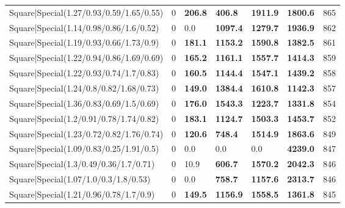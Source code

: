 \begin{tabular}{lrllllr}
 Square|Special(1.27/0.93/0.59/1.65/0.55)                      &             0   & \textbf{206.8} & \textbf{406.8}  & \textbf{1911.9} & \textbf{1800.6} &          865 \\
 Square|Special(1.14/0.98/0.86/1.6/0.52)                       &             0   & 0.0            & \textbf{1097.4} & \textbf{1279.7} & \textbf{1936.9} &          862 \\
 Square|Special(1.19/0.93/0.66/1.73/0.9)                       &             0   & \textbf{181.1} & \textbf{1153.2} & \textbf{1590.8} & \textbf{1382.5} &          861 \\
 Square|Special(1.22/0.94/0.86/1.69/0.69)                      &             0   & \textbf{165.2} & \textbf{1161.1} & \textbf{1557.7} & \textbf{1414.3} &          859 \\
 Square|Special(1.22/0.93/0.74/1.7/0.83)                       &             0   & \textbf{160.5} & \textbf{1144.4} & \textbf{1547.1} & \textbf{1439.2} &          858 \\
 Square|Special(1.24/0.8/0.82/1.68/0.73)                       &             0   & \textbf{149.0} & \textbf{1384.4} & \textbf{1610.8} & \textbf{1142.3} &          857 \\
 Square|Special(1.36/0.83/0.69/1.5/0.69)                       &             0   & \textbf{176.0} & \textbf{1543.3} & \textbf{1223.7} & \textbf{1331.8} &          854 \\
 Square|Special(1.2/0.91/0.78/1.74/0.82)                       &             0   & \textbf{183.1} & \textbf{1124.7} & \textbf{1503.3} & \textbf{1453.7} &          852 \\
 Square|Special(1.23/0.72/0.82/1.76/0.74)                      &             0   & \textbf{120.6} & \textbf{748.4}  & \textbf{1514.9} & \textbf{1863.6} &          849 \\
 Square|Special(1.09/0.83/0.25/1.91/0.5)                       &             0   & 0.0            & 0.0             & 0.0             & \textbf{4239.0} &          847 \\
 Square|Special(1.3/0.49/0.36/1.7/0.71)                        &             0   & 10.9           & \textbf{606.7}  & \textbf{1570.2} & \textbf{2042.3} &          846 \\
 Square|Special(1.07/1.0/0.3/1.8/0.53)                         &             0   & 0.0            & \textbf{758.7}  & \textbf{1157.6} & \textbf{2313.7} &          846 \\
 Square|Special(1.21/0.96/0.78/1.7/0.9)                        &             0   & \textbf{149.5} & \textbf{1156.9} & \textbf{1558.5} & \textbf{1361.8} &          845 \\

\end{tabular}
